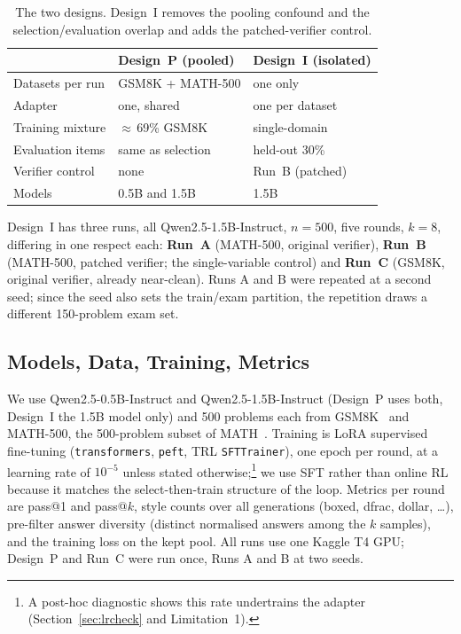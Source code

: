 \documentclass[runningheads]{llncs}
\begin{document}
\begin{table}[t]
\caption{The two designs. Design~I removes the pooling confound and the
selection/evaluation overlap and adds the patched-verifier control.}
\label{tab:designs}
\centering
\begin{tabular}{lll}
\toprule
& Design~P (pooled) & Design~I (isolated) \\
\midrule
Datasets per run & GSM8K + MATH-500 & one only \\
Adapter & one, shared & one per dataset \\
Training mixture & $\approx$\,69\% GSM8K & single-domain \\
Evaluation items & same as selection & held-out 30\% \\
Verifier control & none & Run~B (patched) \\
Models & 0.5B and 1.5B & 1.5B \\
\bottomrule
\end{tabular}
\end{table}

Design~I has three runs, all Qwen2.5-1.5B-Instruct, $n=500$, five rounds, $k=8$,
differing in one respect each: \textbf{Run~A} (MATH-500, original verifier),
\textbf{Run~B} (MATH-500, patched verifier; the single-variable control) and
\textbf{Run~C} (GSM8K, original verifier, already near-clean). Runs A and B were
repeated at a second seed; since the seed also sets the train/exam partition, the
repetition draws a different 150-problem exam set.

\subsection{Models, Data, Training, Metrics}
\label{sec:config}

We use Qwen2.5-0.5B-Instruct and Qwen2.5-1.5B-Instruct (Design~P uses both,
Design~I the 1.5B model only) and 500 problems each from GSM8K~\cite{ref_gsm8k}
and MATH-500, the 500-problem subset of MATH~\cite{ref_math}. Training is LoRA
supervised fine-tuning (\texttt{transformers}, \texttt{peft}, TRL
\texttt{SFTTrainer}), one epoch per round, at a learning rate of $10^{-5}$ unless
stated otherwise;\footnote{A post-hoc diagnostic shows this rate undertrains the
adapter (Section~\ref{sec:lrcheck} and Limitation~1).} we use SFT rather than
online RL because it matches the select-then-train structure of the loop. Metrics
per round are pass@1 and pass@$k$, style counts over all generations (boxed,
dfrac, dollar, \dots), pre-filter answer diversity (distinct normalised answers
among the $k$ samples), and the training loss on the kept pool. All runs use one
Kaggle T4 GPU; Design~P and Run~C were run once, Runs A and B at two seeds.
\end{document}
